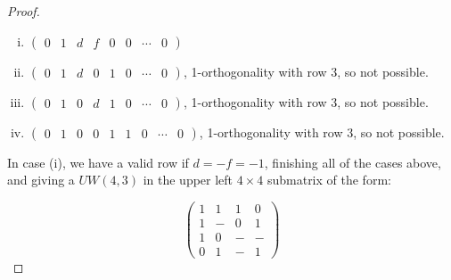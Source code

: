 \begin{lemma}
\begin{proof}
\begin{myind}{1cm}
\end{myind}
\begin{myind}{1.5cm}
      \begin{enumerate}[(i)]
     \item $
      \left(
       \begin{array}{cccccccc}
         0 & 1  & d &f &0&0 &\dotsb &0
       \end{array}
      \right)
      $
    \item $
      \left(
       \begin{array}{cccccccc}
         0 & 1  & d &0 &1 &0 &\dotsb &0
       \end{array}
      \right)
      $, 1-orthogonality with row 3, so not possible.
    \item $
      \left(
       \begin{array}{cccccccc}
         0 & 1  & 0 &d &1 &0&\dotsb &0
       \end{array}
      \right)
      $, 1-orthogonality with row 3, so not possible.
    \item $
      \left(
       \begin{array}{ccccccccc}
         0 & 1  & 0 &0 &1 &1 & 0&\dotsb &0
       \end{array}
      \right)
      $, 1-orthogonality with row 3, so not possible.\end{enumerate}

    In case (i), we have a valid row if $d=-f=-1$, finishing all of the cases above, and giving a $UW(4,3)$ in the upper left $4\times4$ submatrix of the form:
\end{myind}
$$
\left(
\begin{array}{cccc}
 1 & 1 &1 &0 \\
 1 & - &0 &1 \\
 1 & 0 &- &- \\
 0 & 1 &- &1
\end{array}
\right)
$$
\end{proof}

\end{lemma}



